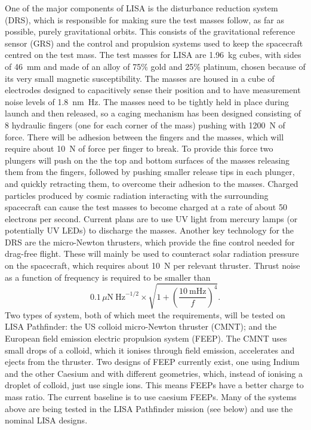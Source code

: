 \documentclass{article}
\newcommand{\muN}{\textmu\hspace{-0.2pt}N\xspace}
\newcommand{\Hz}{Hz\super{-1/2}\xspace}
\begin{document}
One of the major components of LISA is the disturbance reduction system (DRS),
which is responsible for making sure the test masses follow, as far as
possible, purely gravitational orbits. This consists of the gravitational
reference sensor (GRS) and the control and propulsion systems used to keep the
spacecraft centred on the test mass. The test masses for LISA are 1.96~kg
cubes, with sides of 46~mm and made of an alloy of 75\% gold and 25\% platinum,
chosen because of its very small magnetic susceptibility. The masses are housed
in a cube of electrodes designed to capacitively sense their position and
to have measurement noise levels of 1.8~nm~\Hz. The masses need to be
tightly held in place during launch and then released, so a caging mechanism
has been designed consisting of 8 hydraulic fingers (one for each corner of the
mass) pushing with 1200~N of force. There will be adhesion between the fingers
and the masses, which will require about 10~N of force per finger to break. To
provide this force two plungers will push on the the top and bottom surfaces of
the masses releasing them from the fingers, followed by pushing smaller release
tips in each plunger, and quickly retracting them, to overcome their adhesion to
the masses. Charged particles produced by cosmic radiation interacting with the
surrounding spacecraft can cause the test masses to become charged at a rate of
about 50 electrons per second. Current plans are to use UV light from mercury
lamps (or potentially UV LEDs) to discharge the masses. Another key technology
for the DRS are the micro-Newton thrusters, which provide the fine control
needed for drag-free flight. These will mainly be used to counteract solar
radiation pressure on the spacecraft, which requires about 10~\muN per
relevant thruster. Thrust noise as a function of frequency is required to be
smaller than 
%
\[
0.1\,\mu{\mathrm{N\ Hz}}^{-1/2}\times\sqrt{1 +
\left(\frac{10\mathrm{\ mHz}}{f}\right)^4}.
\]
%
Two types of system, both of
which meet the requirements, will be tested on LISA Pathfinder: the US colloid
micro-Newton thruster (CMNT); and the European field emission electric
propulsion system (FEEP). The CMNT uses small drops of a colloid, which it
ionises through field emission, accelerates and ejects from the thruster. Two
designs of FEEP currently exist, one using Indium and the other Caesium and with
different geometries, which, instead of ionising a droplet of colloid, just use
single ions. This means FEEPs have a better charge to mass ratio. The current
baseline is to use caesium FEEPs. Many of the systems above are being tested
in the LISA Pathfinder mission (see below) and use the nominal LISA designs.
\end{document}
